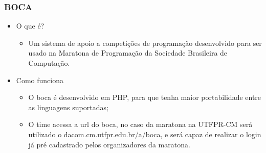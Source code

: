 \begin{frame}
  \frametitle{BOCA}
  \label{tool:boca}
  
  \begin{itemize}
    \item O que é?
    \begin{itemize}
      \item Um sistema de apoio a competições de programação desenvolvido para ser usado na Maratona de Programação da Sociedade Brasileira de Computação.
    \end{itemize}
    \item Como funciona
    \begin{itemize}
      \item O boca é desenvolvido em PHP, para que tenha maior portabilidade entre as linguagens suportadas;
      \item O time acessa a url do boca, no caso da maratona na UTFPR-CM será utilizado o dacom.cm.utfpr.edu.br/a/boca, e será capaz de realizar o login já pré cadastrado pelos organizadores da maratona.
    \end{itemize}
  \end{itemize}
\end{frame}